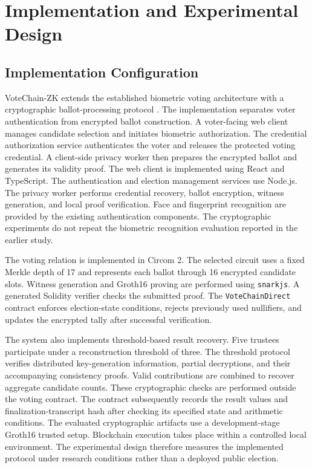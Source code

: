 
\section{Implementation and Experimental Design}
\label{sec:06}
\label{sec:implementation-experiments}

\subsection{Implementation Configuration}
\label{subsec:implementation-profile}



VoteChain-ZK extends the established biometric voting architecture
with a cryptographic ballot-processing protocol
\citep{rifat2026biometric}. The implementation separates voter
authentication from encrypted ballot construction. A voter-facing
web client manages candidate selection and initiates biometric
authorization. The credential authorization service authenticates
the voter and releases the protected voting credential. A
client-side privacy worker then prepares the encrypted ballot
and generates its validity proof.
The web client is implemented using React and TypeScript.
The authentication and election management services use Node.js.
The privacy worker performs credential recovery, ballot encryption,
witness generation, and local proof verification. Face and fingerprint
recognition are provided by the existing authentication components.
The cryptographic experiments do not repeat the biometric
recognition evaluation reported in the earlier study.

The voting relation is implemented in Circom 2. The selected
circuit uses a fixed Merkle depth of 17 and represents each
ballot through 16 encrypted candidate slots. Witness generation
and Groth16 proving are performed using \texttt{snarkjs}.
A generated Solidity verifier checks the submitted proof.
The \texttt{VoteChainDirect} contract enforces election-state
conditions, rejects previously used nullifiers, and updates
the encrypted tally after successful verification.

The system also implements threshold-based result recovery.
Five trustees participate under a reconstruction threshold
of three. The threshold protocol verifies distributed
key-generation information, partial decryptions, and
their accompanying consistency proofs. Valid contributions
are combined to recover aggregate candidate counts.
These cryptographic checks are performed outside the
voting contract. The contract subsequently records the
result values and finalization-transcript hash after
checking its specified state and arithmetic conditions.
The evaluated cryptographic artifacts use a development-stage
Groth16 trusted setup. Blockchain execution takes place
within a controlled local environment. The experimental
design therefore measures the implemented protocol under
research conditions rather than a deployed public election.


